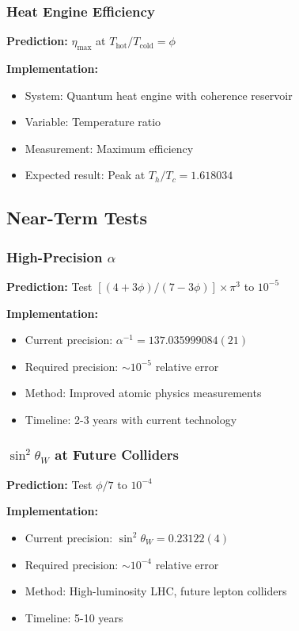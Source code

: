 \documentclass[11pt]{article}
\theoremstyle{definition}
\newcommand{\goldenratio}{\phi}
\begin{document}
\subsubsection{Heat Engine Efficiency}

\textbf{Prediction:} $\eta_{\max}$ at $T_{\text{hot}}/T_{\text{cold}} = \goldenratio$

\textbf{Implementation:}
\begin{itemize}
\item System: Quantum heat engine with coherence reservoir
\item Variable: Temperature ratio
\item Measurement: Maximum efficiency
\item Expected result: Peak at $T_h/T_c = 1.618034$
\end{itemize}

\subsection{Near-Term Tests}

\subsubsection{High-Precision $\alpha$}

\textbf{Prediction:} Test $[(4+3\goldenratio)/(7-3\goldenratio)]\times\pi^3$ to $10^{-5}$

\textbf{Implementation:}
\begin{itemize}
\item Current precision: $\alpha^{-1} = 137.035999084(21)$
\item Required precision: $\sim 10^{-5}$ relative error
\item Method: Improved atomic physics measurements
\item Timeline: 2-3 years with current technology
\end{itemize}

\subsubsection{$\sin^2\theta_W$ at Future Colliders}

\textbf{Prediction:} Test $\goldenratio/7$ to $10^{-4}$

\textbf{Implementation:}
\begin{itemize}
\item Current precision: $\sin^2\theta_W = 0.23122(4)$
\item Required precision: $\sim 10^{-4}$ relative error
\item Method: High-luminosity LHC, future lepton colliders
\item Timeline: 5-10 years
\end{itemize}
\end{document}
